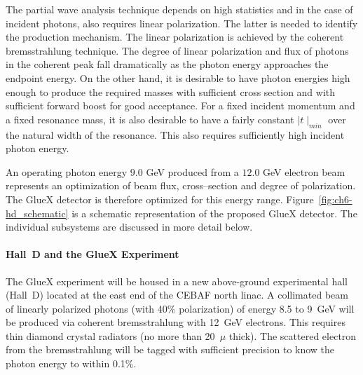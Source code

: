 \hspace{1cm}
The partial wave analysis technique  depends on high statistics and
in the case of incident photons, also requires linear polarization.
The latter is needed to identify the production mechanism. The linear 
polarization is achieved by the coherent bremsstrahlung technique.  
The degree of linear polarization and flux of photons in the coherent 
peak fall dramatically as the photon energy approaches
the endpoint energy.  On the other hand, it is desirable to have
photon energies high enough to produce the required masses with
sufficient cross section and with sufficient forward boost for good
acceptance. For a fixed incident momentum and a fixed resonance
mass, it is also desirable to have a fairly constant $\mid t\mid_{min}$ over
the natural width of the resonance.  This also requires sufficiently
high incident photon energy. 

\hspace{1cm}
An operating photon energy $9.0$ GeV produced from a $12.0$ GeV 
electron beam represents an optimization of beam flux, cross--section and 
degree of polarization.  The GlueX detector is therefore optimized for 
this energy range. Figure~\ref{fig:ch6-hd_schematic} is a schematic 
representation of the proposed GlueX detector. The individual 
subsystems are discussed in more detail below.


\paragraph{Hall~D and the GlueX Experiment}

The GlueX experiment will be housed in a new above-ground experimental hall
(Hall~D) located at the east end of the CEBAF north linac. A collimated beam 
of linearly polarized photons (with 40\% polarization) of energy 8.5 to 9~GeV 
will be produced via coherent bremsstrahlung with 12~GeV electrons. This 
requires thin diamond  crystal radiators (no more than 20~$\mu$ thick). 
The scattered electron from the bremsstrahlung will be tagged with sufficient 
precision to know the photon energy to within 0.1\%.


